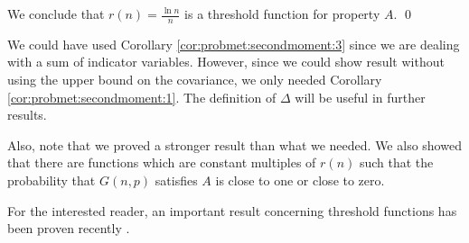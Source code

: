 We conclude that $r(n) = \frac{\ln n}{n}$ is a threshold function for property $A$. \qed \par
We could have used Corollary \ref{cor:probmet:secondmoment:3} since we are dealing with a sum of indicator variables. However, since we could show result without using the upper bound on the covariance, we only needed Corollary \ref{cor:probmet:secondmoment:1}. The definition of $\Delta$ will be useful in further results. \par 
Also, note that we proved a stronger result than what we needed. We also showed that there are functions which are constant multiples of $r(n)$ such that the probability that $G(n, p)$ satisfies $A$ is close to one or close to zero. \par
For the interested reader, an important result concerning threshold functions has been proven recently \cite{park2023proof}. \par
